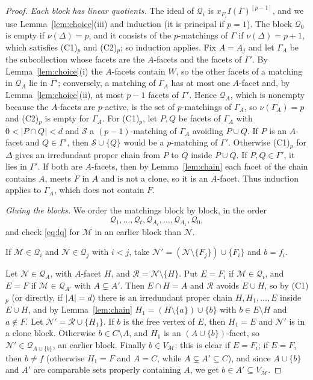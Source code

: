 \documentclass{amsart}
\theoremstyle{definition}
\theoremstyle{remark}
\begin{document}
\begin{proof}
\emph{Each block has linear quotients.} The ideal of $\mathcal Q_i$ is $x_{F_i}I(\Gamma)^{[p-1]}$, and we use Lemma~\ref{lem:choice}(iii) and induction (it is principal if $p=1$). The block $\mathcal Q_0$ is empty if $\nu(\Delta)=p$, and it consists of the $p$-matchings of $\Gamma$ if $\nu(\Delta)=p+1$, which satisfies (C1)$_p$ and (C2)$_p$; so induction applies. Fix $A=A_j$ and let $\Gamma_A$ be the subcollection whose facets are the $A$-facets and the facets of $\Gamma'$. By Lemma~\ref{lem:choice}(i) the $A$-facets contain $W$, so the other facets of a matching in $\mathcal Q_A$ lie in $\Gamma'$; conversely, a matching of $\Gamma_A$ has at most one $A$-facet and, by Lemma~\ref{lem:choice}(ii), at most $p-1$ facets of $\Gamma'$. Hence $\mathcal Q_A$, which is nonempty because the $A$-facets are $p$-active, is the set of $p$-matchings of $\Gamma_A$, so $\nu(\Gamma_A)=p$ and (C2)$_p$ is empty for $\Gamma_A$. For (C1)$_p$, let $P,Q$ be facets of $\Gamma_A$ with $0<|P\cap Q|<d$ and $\mathcal S$ a $(p-1)$-matching of $\Gamma_A$ avoiding $P\cup Q$. If $P$ is an $A$-facet and $Q\in\Gamma'$, then $\mathcal S\cup\{Q\}$ would be a $p$-matching of $\Gamma'$. Otherwise (C1)$_p$ for $\Delta$ gives an irredundant proper chain from $P$ to $Q$ inside $P\cup Q$. If $P,Q\in\Gamma'$, it lies in $\Gamma'$. If both are $A$-facets, then by Lemma~\ref{lem:chain} each facet of the chain contains $A$, meets $F$ in $A$ and is not a clone, so it is an $A$-facet. Thus induction applies to $\Gamma_A$, which does not contain $F$.

\emph{Gluing the blocks.} We order the matchings block by block, in the order
\[
\mathcal Q_1,\ldots,\mathcal Q_t,\mathcal Q_{A_\ell},\ldots,\mathcal Q_{A_1},\mathcal Q_0,
\]
and check \eqref{eq:lq} for $\mathcal M$ in an earlier block than $\mathcal N$.

If $\mathcal M\in\mathcal Q_i$ and $\mathcal N\in\mathcal Q_j$ with $i<j$, take $\mathcal N'=(\mathcal N\setminus\{F_j\})\cup\{F_i\}$ and $b=f_i$.

Let $\mathcal N\in\mathcal Q_A$, with $A$-facet $H$, and $\mathcal R=\mathcal N\setminus\{H\}$. Put $E=F_i$ if $\mathcal M\in\mathcal Q_i$, and $E=F$ if $\mathcal M\in\mathcal Q_{A'}$ with $A\subsetneq A'$. Then $E\cap H=A$ and $\mathcal R$ avoids $E\cup H$, so by (C1)$_p$ (or directly, if $|A|=d$) there is an irredundant proper chain $H,H_1,\ldots,E$ inside $E\cup H$, and by Lemma~\ref{lem:chain} $H_1=(H\setminus\{a\})\cup\{b\}$ with $b\in E\setminus H$ and $a\notin F$. Let $\mathcal N'=\mathcal R\cup\{H_1\}$. If $b$ is the free vertex of $E$, then $H_1=E$ and $\mathcal N'$ is in a clone block. Otherwise $b\in C\setminus A$, and $H_1$ is an $(A\cup\{b\})$-facet, so $\mathcal N'\in\mathcal Q_{A\cup\{b\}}$, an earlier block. Finally $b\in V_{\mathcal M}$: this is clear if $E=F_i$; if $E=F$, then $b\neq f$ (otherwise $H_1=F$ and $A=C$, while $A\subsetneq A'\subseteq C$), and since $A\cup\{b\}$ and $A'$ are comparable sets properly containing $A$, we get $b\in A'\subseteq V_{\mathcal M}$.


\end{proof}
\end{document}

